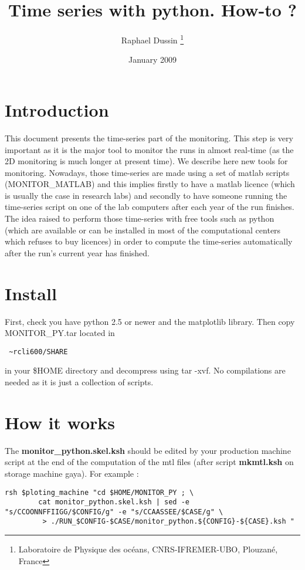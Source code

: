 \documentclass[a4paper,11pt]{article}
\begin{document}
\title{Time series with python. How-to ?}
\author{Raphael Dussin  
\thanks{ Laboratoire de Physique des oc\'{e}ans, CNRS-IFREMER-UBO, Plouzan\'e, France}}
\date{January 2009}
\maketitle

\section{Introduction}

This document presents the time-series part of the monitoring. This step is very important as it is the major tool to monitor
the runs in almost real-time (as the 2D monitoring is much longer at present time). We describe here new tools for monitoring.
Nowadays, those time-series are made using a set of matlab scripts (MONITOR\_MATLAB) and this implies firstly to have a matlab licence
(which is usually the case in research labs) and secondly to have someone running the time-series script on one of the lab computers
after each year of the run finishes. The idea raised to perform those time-series with free tools such as python (which are available or
can be installed in most of the computational centers which refuses to buy licences) in order to compute the time-series automatically
after the run's current year has finished.  

\section{Install}

First, check you have python 2.5 or newer and the matplotlib library. Then copy MONITOR\_PY.tar located in
\begin{verbatim} ~rcli600/SHARE \end{verbatim} in your \$HOME directory and decompress using tar -xvf. 
No compilations are needed as it is just a collection of scripts.


\section{How it works}

The \textbf{monitor\_python.skel.ksh} should be edited by your production machine script at the end of the computation of the mtl files
(after script \textbf{mkmtl.ksh} on storage machine gaya). 
For example :
\begin{verbatim}
rsh $ploting_machine "cd $HOME/MONITOR_PY ; \
		cat monitor_python.skel.ksh | sed -e "s/CCOONNFFIIGG/$CONFIG/g" -e "s/CCAASSEE/$CASE/g" \
		 > ./RUN_$CONFIG-$CASE/monitor_python.${CONFIG}-${CASE}.ksh "
\end{verbatim}
\end{document}
